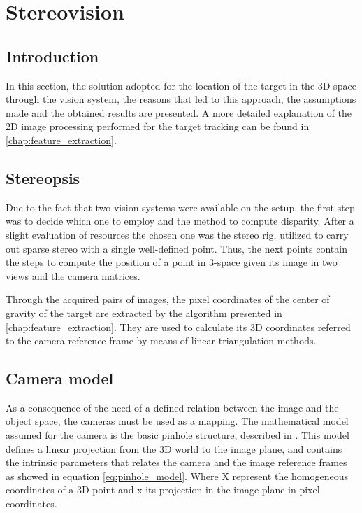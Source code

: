 
\chapter{Stereovision} %
\label{chap:stereopsis}

\section{Introduction}
In this section, the solution adopted for the location of the target in the 3D space through the vision system, the reasons that led to this approach, the assumptions made and the obtained results are presented. 
A more detailed explanation of the 2D image processing performed for the target tracking can be found in \ref{chap:feature_extraction}.

\section{Stereopsis}
Due to the fact that two vision systems were available on the setup, the first step was to decide which one to employ and the method to compute disparity. 
After a slight evaluation of resources the chosen one was the stereo rig, utilized to carry out sparse stereo with a single well-defined point. 
Thus, the next points contain the steps to compute the position of a point in 3-space given its image in two views and the camera matrices. 

Through the acquired pairs of images, the pixel coordinates of the center of gravity of the target are extracted by the algorithm presented in \ref{chap:feature_extraction}. 
They are used to calculate its 3D coordinates referred to the camera reference frame by means of linear triangulation methods.

\section{Camera model}
As a consequence of the need of a defined relation between the image and the object space, the cameras must be used as a mapping. 
The mathematical model assumed for the camera is the basic pinhole structure, described in \cite{Hartley}. 
This model defines a linear projection from the 3D world to the image plane, and contains the intrinsic parameters that relates the camera and the image reference frames as showed in equation \ref{eq:pinhole_model}. Where X represent the homogeneous coordinates of a 3D point and x its projection in the image plane in pixel coordinates.
 
